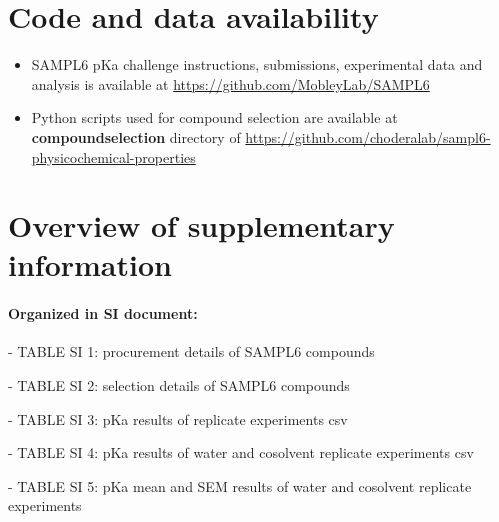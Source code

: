 \documentclass[9pt,lineno]{elife}
\begin{document}
\section{Code and data availability}
\begin{minipage}{15cm}
\begin{itemize}

\item SAMPL6 pKa challenge instructions, submissions, experimental data and analysis is available at  \href{https://github.com/MobleyLab/SAMPL6}{https://github.com/MobleyLab/SAMPL6}

\item Python scripts used for compound selection are available at \textbf{compound\textunderscore selection} directory of  
\href{https://github.com/choderalab/sampl6\textendash physicochemical\textendash properties}{https://github.com/choderalab/sampl6-physicochemical-properties}

\end{itemize}
\end{minipage}


\section{Overview of supplementary information}

\paragraph{Organized in SI document:}

- TABLE SI 1: procurement details of SAMPL6 compounds  

- TABLE SI 2: selection details of SAMPL6 compounds  

- TABLE SI 3: pKa results of replicate experiments csv

- TABLE SI 4: pKa results of water and cosolvent replicate experiments csv

- TABLE SI 5: pKa mean and SEM results of water and cosolvent replicate experiments
\end{document}
